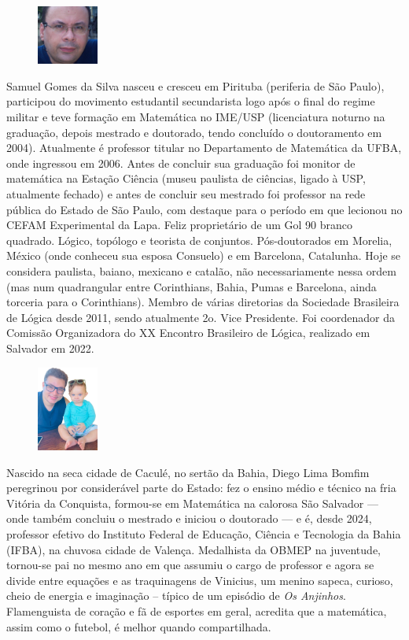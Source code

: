 \documentclass{hipatia}
\begin{document}
\begin{figure}
\vspace{-10pt}
  \includegraphics[width=2cm]{Samuel.jpeg}
\end{figure}\noindent
Samuel Gomes da Silva nasceu e cresceu em Pirituba 
(periferia de São Paulo), participou do movimento 
estudantil secundarista logo após o final do 
regime militar e teve formação em Matemática no 
IME/USP (licenciatura noturno na graduação, 
depois mestrado e doutorado, tendo concluído o 
doutoramento em 2004). Atualmente é professor 
titular no Departamento de Matemática da UFBA, 
onde ingressou em 2006.  Antes de concluir sua 
graduação foi monitor de matemática na Estação 
Ciência (museu paulista de ciências, ligado à USP, 
atualmente fechado) e antes de concluir seu mestrado 
foi professor na rede pública do Estado de São Paulo, 
com destaque para o período em que lecionou no CEFAM 
Experimental da Lapa. Feliz  proprie\-tário de um Gol 90 
branco quadrado. Lógico, topólogo e teorista de conjuntos. 
Pós-doutorados em Morelia, México (onde conheceu sua 
esposa Consuelo) e em Barcelona, Catalunha.  
Hoje se considera paulista, baiano, mexicano e 
catalão, não necessariamente nessa ordem (mas 
num quadrangular entre Corinthians, Bahia, Pumas e 
Barcelona, ainda torceria para o Corinthians). 
Membro de várias diretorias  da Sociedade Brasileira 
de Lógica desde 2011, sendo atualmente 2o. Vice Presidente. 
Foi coordenador da Comissão Organizadora do XX Encontro 
Brasileiro de Lógica, realizado em Salvador em 2022.

\vspace{1cm}

\begin{figure}
\vspace{-10pt}
  \includegraphics[width=2cm]{diego.png}
\end{figure}\noindent
Nascido na seca cidade de Caculé, no sertão da Bahia, Diego Lima Bomfim peregrinou por considerável parte do Estado: fez o ensino médio e técnico na fria Vitória da Conquista, formou-se em Matemática na calorosa São Salvador --- onde também concluiu o mestrado e iniciou o doutorado --- e é, desde 2024, professor efetivo do Instituto Federal de Educação, Ciência e Tecnologia da Bahia (IFBA), na chuvosa cidade de Valença. Medalhista da OBMEP na juventude, tornou-se pai no mesmo ano em que assumiu o cargo de professor e agora se divide entre equações e as traquinagens de Vinicius, um menino sapeca, curioso, cheio de energia e imaginação -- típico de um episódio de {\it Os Anjinhos}. Flamenguista de coração e fã de esportes em geral, acredita que a matemática, assim como o futebol, é melhor quando compartilhada.
\end{document}
